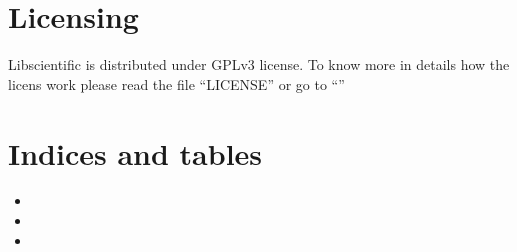 \documentclass[letterpaper,10pt,english]{sphinxmanual}
\begin{document}
\sphinxstepscope


\chapter{Licensing}
\label{\detokenize{Licensing:licensing}}\label{\detokenize{Licensing::doc}}
\sphinxAtStartPar
Libscientific is distributed under GPLv3 license.
To know more in details how the licens work please read the file “LICENSE” or go to “”


\chapter{Indices and tables}
\label{\detokenize{index:indices-and-tables}}\begin{itemize}
\item {} 
\sphinxAtStartPar
{}

\item {} 
\sphinxAtStartPar
{}

\item {} 
\sphinxAtStartPar
{}

\end{itemize}



\renewcommand{\indexname}{Index}
\printindex
\end{document}
